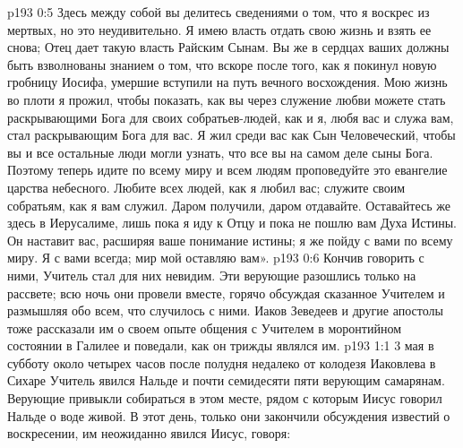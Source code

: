 \vs p193 0:5 Здесь между собой вы делитесь сведениями о том, что я воскрес из мертвых, но это неудивительно. Я имею власть отдать свою жизнь и взять ее снова; Отец дает такую власть Райским Сынам. Вы же в сердцах ваших должны быть взволнованы знанием о том, что вскоре после того, как я покинул новую гробницу Иосифа, умершие вступили на путь вечного восхождения. Мою жизнь во плоти я прожил, чтобы показать, как вы через служение любви можете стать раскрывающими Бога для своих собратьев\hyp{}людей, как и я, любя вас и служа вам, стал раскрывающим Бога для вас. Я жил среди вас как Сын Человеческий, чтобы вы и все остальные люди могли узнать, что все вы на самом деле сыны Бога. Поэтому теперь идите по всему миру и всем людям проповедуйте это евангелие царства небесного. Любите всех людей, как я любил вас; служите своим собратьям, как я вам служил. Даром получили, даром отдавайте. Оставайтесь же здесь в Иерусалиме, лишь пока я иду к Отцу и пока не пошлю вам Духа Истины. Он наставит вас, расширяя ваше понимание истины; я же пойду с вами по всему миру. Я с вами всегда; мир мой оставляю вам».
\vs p193 0:6 \pc Кончив говорить с ними, Учитель стал для них невидим. Эти верующие разошлись только на рассвете; всю ночь они провели вместе, горячо обсуждая сказанное Учителем и размышляя обо всем, что случилось с ними. Иаков Зеведеев и другие апостолы тоже рассказали им о своем опыте общения с Учителем в моронтийном состоянии в Галилее и поведали, как он трижды являлся им.
\vs p193 1:1 3 мая в субботу около четырех часов после полудня недалеко от колодезя Иаковлева в Сихаре Учитель явился Нальде и почти семидесяти пяти верующим самарянам. Верующие привыкли собираться в этом месте, рядом с которым Иисус говорил Нальде о воде живой. В этот день, только они закончили обсуждения известий о воскресении, им неожиданно явился Иисус, говоря:
